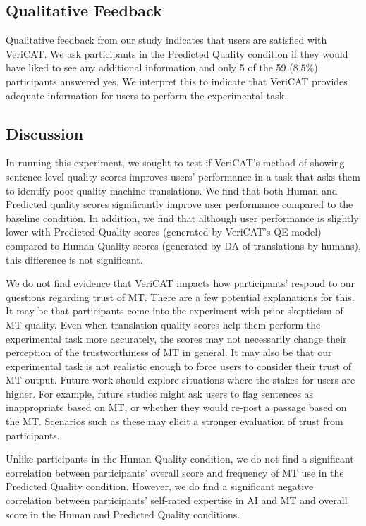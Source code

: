 \subsection{\textbf{Qualitative Feedback}}

Qualitative feedback from our study indicates that users are satisfied with VeriCAT. We ask participants in the Predicted Quality condition if they would have liked to see any additional information and only 5 of the 59 ($8.5\%$) participants answered yes. We interpret this to indicate that VeriCAT provides adequate information for users to perform the experimental task.       

\subsection{Discussion} 

In running this experiment, we sought to test if VeriCAT's method of showing sentence-level quality scores improves users' performance in a task that asks them to identify poor quality machine translations. We find that both Human and Predicted quality scores significantly improve user performance compared to the baseline condition. In addition, we find that although user performance is slightly lower with Predicted Quality scores (generated by VeriCAT's QE model) compared to Human Quality scores (generated by DA of translations by humans), this difference is not significant. 

We do not find evidence that VeriCAT impacts how participants' respond to our questions regarding trust of MT. There are a few potential explanations for this. It may be that participants come into the experiment with prior skepticism of MT quality. Even when translation quality scores help them perform the experimental task more accurately, the scores may not necessarily change their perception of the trustworthiness of MT in general. It may also be that our experimental task is not realistic enough to force users to consider their trust of MT output. Future work should explore situations where the stakes for users are higher. For example, future studies might ask users to flag sentences as inappropriate based on MT, or whether they would re-post a passage based on the MT. Scenarios such as these may elicit a stronger evaluation of trust from participants.

Unlike participants in the Human Quality condition, we do not find a significant correlation between participants' overall score and frequency of MT use in the Predicted Quality condition. However, we do find a significant negative correlation between participants' self-rated expertise in AI and MT and overall score in the Human and Predicted Quality conditions.  

